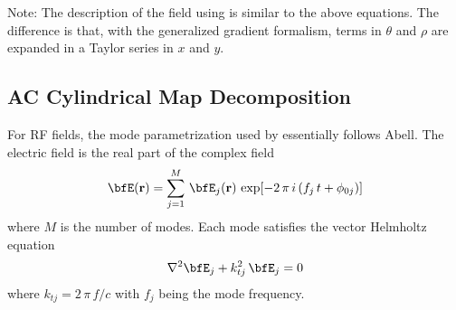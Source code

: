 Note: The description of the field using \cite{b:newton} is similar to
the above equations. The difference is that, with the generalized gradient formalism, terms in
$\theta$ and $\rho$ are expanded in a Taylor series in $x$ and $y$.

\subsection{AC Cylindrical Map Decomposition}
\label{s:cylind.ac}

For RF fields, the  mode parametrization used by \bmad essentially
follows Abell\cite{b:rf.abell}. The electric field is the real part of the complex field
\begin{equation}
  \bfE(\bfr) = \sum_{j=1}^M \, \bfE_j(\bfr) \, \exp[{-2\, \pi \, i \, (f_j \, t + \phi_{0j})}]
  \label{eseei}
\end{equation}
where $M$ is the number of modes. Each mode satisfies the vector Helmholtz
equation
\begin{equation}
  \nabla^2 \bfE_j + k_{tj}^2 \, \bfE_j = 0
  \label{bke}
\end{equation}
where $k_{tj} = 2 \, \pi \, f/c$ with $f_j$ being the mode frequency.

